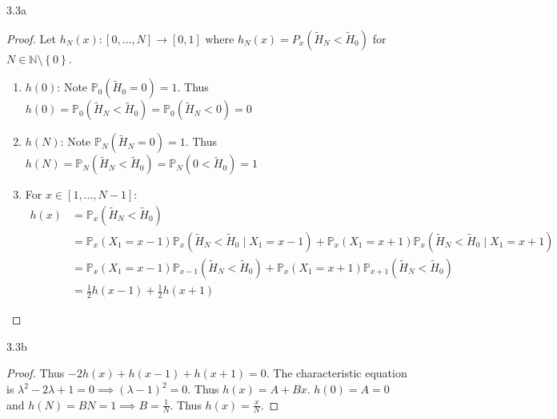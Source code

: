 \documentclass{article}
\newcommand{\PR}{\mathbb{P}}
\newcommand{\N}{\mathbb{N}}
\begin{document}
\begin{PROB}{3.3a}\label{Problem 3.3a.}
\end{PROB}
\begin{proof}
    Let $h_N(x): [0, \dots, N] \to [0, 1]$ where $h_N(x)  = P_x(\tilde{H}_N < \tilde{H}_0)$ for $N \in \N \setminus \left\{ 0 \right\}$.
    
    \begin{enumerate}
        \item $h(0)$: Note $\PR_0(\tilde{H}_0 = 0) = 1$. Thus $h(0) = \PR_0(\tilde{H}_N < \tilde{H}_0) = \PR_0(\tilde{H}_N < 0) = 0$
        \item $h(N)$: Note $\PR_N(\tilde{H}_N = 0) = 1$. Thus $h(N) = \PR_N(\tilde{H}_N < \tilde{H}_0) = \PR_N(0 < \tilde{H}_0) = 1$
        \item For $x \in [1, \dots, N - 1]$: \begin{align*}
            h(x) &= \PR_x(\tilde{H}_N < \tilde{H}_0)\\
            &= \PR_x(X_1 = x - 1)\PR_x(\tilde{H}_N < \tilde{H}_0 \mid X_1 = x - 1) +  \PR_x(X_1 = x + 1)\PR_x(\tilde{H}_N < \tilde{H}_0 \mid X_1 = x + 1) \\
            &= \PR_x(X_1 = x - 1)\PR_{x - 1}(\tilde{H}_N < \tilde{H}_0) +  \PR_x(X_1 = x + 1)\PR_{x + 1}(\tilde{H}_N < \tilde{H}_0) \\
            &= \frac{1}{2}h(x - 1) + \frac{1}{2}h(x + 1)
        \end{align*} 
    \end{enumerate}
       
\end{proof}

\begin{PROB}{3.3b}\label{Problem 3.3b.}
\end{PROB}
\begin{proof}
    Thus $-2h(x) + h(x - 1) + h(x + 1) = 0$. The characteristic equation is $\lambda^2 - 2\lambda + 1 = 0 \implies (\lambda - 1)^2 = 0$. Thus $h(x) = A + Bx$. $h(0) = A = 0$ and $h(N) = BN = 1 \implies B = \frac{1}{N}$. Thus $h(x) = \frac{x}{N}$.       
\end{proof}


\bigskip
\end{document}
